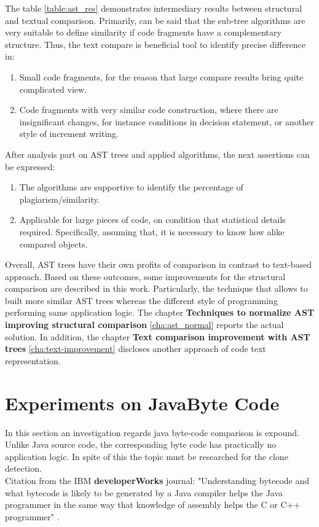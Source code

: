 \documentclass{report}
\begin{document}
The table \ref{table:ast_res} demonstrates intermediary results between structural and textual comparison. Primarily, can be said that the sub-tree algorithms are very suitable to define similarity if code fragments have a complementary structure. Thus, the text compare is beneficial tool to identify precise difference in:
\begin{enumerate}
	\item Small code fragments, for the reason that large compare results bring quite complicated view.
	\item Code fragments with very similar code construction, where there are insignificant changes, for instance conditions in decision statement, or another style of increment writing.
\end{enumerate}
\newpage
After analysis part on AST trees and applied algorithms, the next assertions can be expressed:
\begin{enumerate}
	\item The algorithms are supportive to identify the percentage of plagiarism/similarity.
	\item Applicable for large pieces of code, on condition that statistical details required. Specifically, assuming that, it is necessary to know how alike compared objects.
\end{enumerate}
Overall, AST trees have their own profits of comparison in contrast to text-based approach. 
Based on these outcomes, some improvements for the structural comparison are described in this work. Particularly, the technique that allows to built more similar AST trees whereas the different style of programming performing same application logic. The chapter \textbf{Techniques to normalize AST improving structural comparison} \ref{cha:ast_normal} reports the actual solution. In addition, the chapter \textbf{Text comparison improvement with AST trees} \ref{cha:text-improvement} discloses another approach of code text representation.

\section{Experiments on JavaByte Code}
\label{sec: java-code-experiments}

In this section an investigation regards java byte-code comparison is expound. Unlike Java source code, the corresponding byte code has practically no application logic. In spite of this the topic must be researched for the clone detection. \\
Citation from the IBM \textbf{developerWorks} journal: "Understanding bytecode and what bytecode is likely to be generated by a Java compiler helps the Java programmer in the same way that knowledge of assembly helps the C or C++ programmer" \cite{ibm}. 
\end{document}
